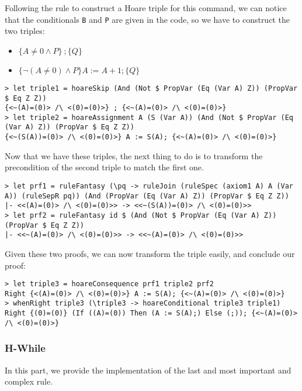 \documentclass{article}
\begin{document}
Following the rule to construct a Hoare triple for this command, we can notice that the conditionals \texttt{B} and \texttt{P} are given in the code, so we have to construct the two triples:

\begin{itemize}
\item $\{A \neq 0 \land P\} \ ; \{Q\}$
\item $\{\neg(A \neq 0) \land P\} A := A + 1; \{Q\}$
\end{itemize}

\begin{lstlisting}
> let triple1 = hoareSkip (And (Not $ PropVar (Eq (Var A) Z)) (PropVar $ Eq Z Z))
{<~(A)=(0)> /\ <(0)=(0)>} ; {<~(A)=(0)> /\ <(0)=(0)>}
> let triple2 = hoareAssignment A (S (Var A)) (And (Not $ PropVar (Eq (Var A) Z)) (PropVar $ Eq Z Z))
{<~(S(A))=(0)> /\ <(0)=(0)>} A := S(A); {<~(A)=(0)> /\ <(0)=(0)>}
\end{lstlisting}

Now that we have these triples, the next thing to do is to transform the precondition of the second triple to match the first one.

\begin{lstlisting}
> let prf1 = ruleFantasy (\pq -> ruleJoin (ruleSpec (axiom1 A) A (Var A)) (ruleSepR pq)) (And (PropVar (Eq (Var A) Z)) (PropVar $ Eq Z Z))
|- <<(A)=(0)> /\ <(0)=(0)>> -> <<~(S(A))=(0)> /\ <(0)=(0)>>
> let prf2 = ruleFantasy id $ (And (Not $ PropVar (Eq (Var A) Z)) (PropVar $ Eq Z Z))
|- <<~(A)=(0)> /\ <(0)=(0)>> -> <<~(A)=(0)> /\ <(0)=(0)>>
\end{lstlisting}

Given these two proofs, we can now transform the triple easily, and conclude our proof:

\begin{lstlisting}
> let triple3 = hoareConsequence prf1 triple2 prf2
Right {<(A)=(0)> /\ <(0)=(0)>} A := S(A); {<~(A)=(0)> /\ <(0)=(0)>}
> whenRight triple3 (\triple3 -> hoareConditional triple3 triple1)
Right {(0)=(0)} (If ((A)=(0)) Then (A := S(A);) Else (;)); {<~(A)=(0)> /\ <(0)=(0)>}
\end{lstlisting}

\subsubsection{H-While}

In this part, we provide the implementation of the last and most important and complex rule.
\end{document}
